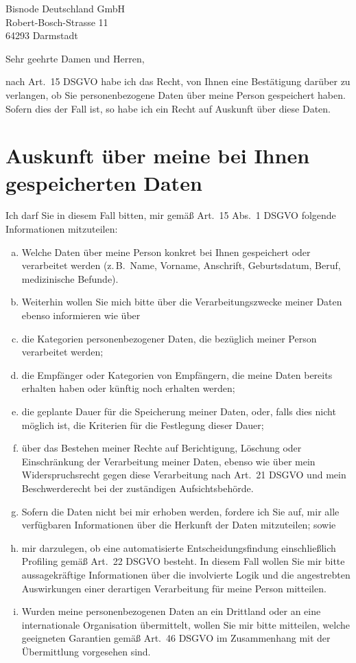 \documentclass[a4paper,DIV=11]{scrartcl}
\newcommand{\includepostage}[1]{%
  \AddToShipoutPictureBG*{%
    \put(\LenToUnit{11mm},\LenToUnit{-85mm}){%
      \texttt{[image: \#1]}}}}
\begin{document}
\begin{letter}{%

Bisnode Deutschland GmbH\\
Robert-Bosch-Strasse 11\\
64293 Darmstadt
}
\opening{Sehr geehrte Damen und Herren,}

nach Art.\ 15 DSGVO habe ich das Recht, von Ihnen eine Bestätigung darüber zu verlangen, ob Sie personenbezogene Daten über meine Person gespeichert haben. Sofern dies der Fall ist, so habe ich ein Recht auf Auskunft über diese Daten.

\section{Auskunft über meine bei Ihnen gespeicherten Daten}

Ich darf Sie in diesem Fall bitten, mir gemäß Art.\ 15 Abs.\ 1 DSGVO folgende Informationen mitzuteilen:
\begin{enumerate}[(a)]
\item Welche Daten über meine Person konkret bei Ihnen gespeichert oder verarbeitet werden (z.\,B.\ Name, Vorname, Anschrift, Geburtsdatum, Beruf, medizinische Befunde).
\item Weiterhin wollen Sie mich bitte über die Verarbeitungszwecke meiner Daten ebenso informieren wie über
\item die Kategorien personenbezogener Daten, die bezüglich meiner Person verarbeitet werden;
\item die Empfänger oder Kategorien von Empfängern, die meine Daten bereits erhalten haben oder künftig noch erhalten werden;
\item die geplante Dauer für die Speicherung meiner Daten, oder, falls dies nicht möglich ist, die Kriterien für die Festlegung dieser Dauer;
\item über das Bestehen meiner Rechte auf Berichtigung, Löschung oder Einschränkung der Verarbeitung meiner Daten, ebenso wie über mein Widerspruchsrecht gegen diese Verarbeitung nach Art.\ 21 DSGVO und mein Beschwerderecht bei der zuständigen Aufsichtsbehörde.
\item Sofern die Daten nicht bei mir erhoben werden, fordere ich Sie auf, mir alle verfügbaren Informationen über die Herkunft der Daten mitzuteilen; sowie
\item mir darzulegen, ob eine automatisierte Entscheidungsfindung einschließlich Profiling gemäß Art.\ 22 DSGVO besteht. In diesem Fall wollen Sie mir bitte aussagekräftige Informationen über die involvierte Logik und die angestrebten Auswirkungen einer derartigen Verarbeitung für meine Person mitteilen.
\item Wurden meine personenbezogenen Daten an ein Drittland oder an eine internationale Organisation übermittelt, wollen Sie mir bitte mitteilen, welche geeigneten Garantien gemäß Art.\ 46 DSGVO im Zusammenhang mit der Übermittlung vorgesehen sind.
\end{enumerate}


\end{letter}
\end{document}
